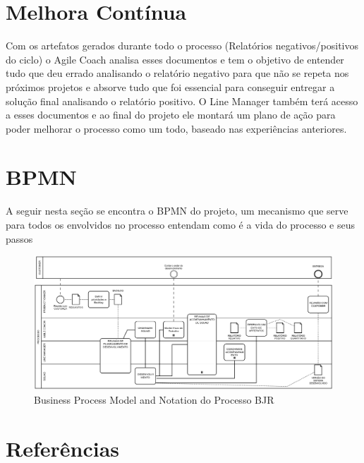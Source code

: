 \documentclass[	DIV=calc,%
							paper=a4,%
							fontsize=12pt,%
							onecolumn]{scrartcl}	 					%
\begin{document}
\section{Melhora Contínua}
Com os artefatos gerados durante todo o processo (Relatórios negativos/positivos do ciclo) o Agile Coach analisa esses documentos e tem o objetivo de entender tudo que deu errado analisando o relatório negativo para que não se repeta nos próximos projetos e absorve tudo que foi essencial para conseguir entregar a solução final analisando o relatório positivo. O Line Manager também terá acesso a esses documentos e ao final do projeto ele montará um plano de ação para poder melhorar o processo como um todo, baseado nas experiências anteriores.


\section{BPMN}
A seguir nesta seção se encontra o BPMN\cite{bpmn} do projeto, um mecanismo que serve para todos os envolvidos no processo entendam como é a vida do processo e seus passos
\begin{figure}[!htb]
	\centering
	\includegraphics[width=\textwidth]{bpmn}
	\caption{Business Process Model and Notation do Processo BJR}
	\label{bpmn}
\end{figure}

\clearpage
\section{Referências}
\begingroup
\renewcommand{\section}[2]{}


 
\endgroup
\end{document}
